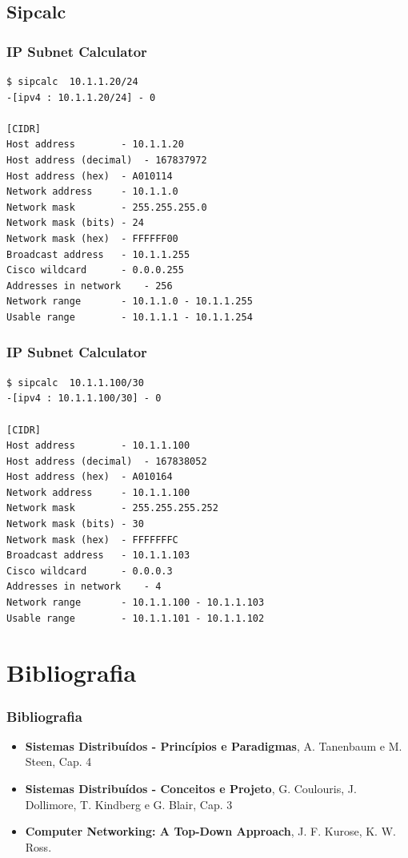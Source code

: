 \documentclass[xcolor=dvipsnames,10pt,compress,aspectratio=169]{beamer}
\begin{document}
\subsection{Sipcalc}
\begin{frame}[fragile]
	\frametitle{IP Subnet Calculator}
\begin{small}
\begin{verbatim}
$ sipcalc  10.1.1.20/24
-[ipv4 : 10.1.1.20/24] - 0

[CIDR]
Host address		- 10.1.1.20
Host address (decimal)	- 167837972
Host address (hex)	- A010114
Network address		- 10.1.1.0
Network mask		- 255.255.255.0
Network mask (bits)	- 24
Network mask (hex)	- FFFFFF00
Broadcast address	- 10.1.1.255
Cisco wildcard		- 0.0.0.255
Addresses in network	- 256
Network range		- 10.1.1.0 - 10.1.1.255
Usable range		- 10.1.1.1 - 10.1.1.254
\end{verbatim}
\end{small}
\end{frame}
\begin{frame}[fragile]
	\frametitle{IP Subnet Calculator}
\begin{small}
\begin{verbatim}
$ sipcalc  10.1.1.100/30
-[ipv4 : 10.1.1.100/30] - 0

[CIDR]
Host address		- 10.1.1.100
Host address (decimal)	- 167838052
Host address (hex)	- A010164
Network address		- 10.1.1.100
Network mask		- 255.255.255.252
Network mask (bits)	- 30
Network mask (hex)	- FFFFFFFC
Broadcast address	- 10.1.1.103
Cisco wildcard		- 0.0.0.3
Addresses in network	- 4
Network range		- 10.1.1.100 - 10.1.1.103
Usable range		- 10.1.1.101 - 10.1.1.102
\end{verbatim}
\end{small}
\end{frame}
\section{Bibliografia}

\begin{frame}
  \frametitle{Bibliografia}
  \begin{itemize}
  \item {\bf Sistemas Distribuídos - Princípios e Paradigmas}, A. Tanenbaum e M. Steen, Cap. 4
  \item {\bf Sistemas Distribuídos - Conceitos e Projeto}, G. Coulouris, J. Dollimore, T. Kindberg e G. Blair, Cap. 3
  \item {\bf Computer Networking: A Top-Down Approach}, J. F. Kurose, K. W. Ross.
  \end{itemize}
\end{frame}
\end{document}
